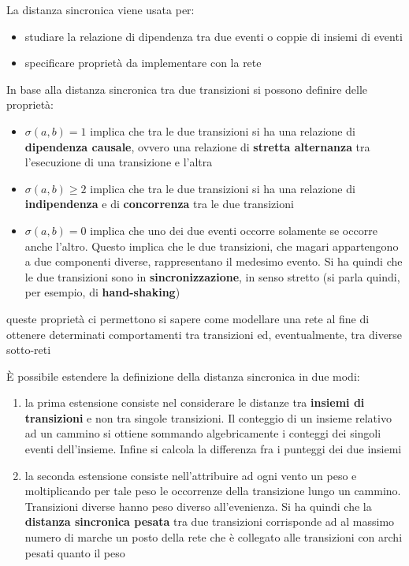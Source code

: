 \documentclass[a4paper,12pt, oneside]{book}
\begin{document}
La distanza sincronica viene usata per:
\begin{itemize}
  \item studiare la relazione di dipendenza tra due eventi o coppie di insiemi
  di eventi
  \item specificare proprietà da implementare con la rete
\end{itemize}
\newpage
\begin{definizione}
  In base alla distanza sincronica tra due transizioni si possono definire delle
  proprietà:
  \begin{itemize}
    \item $\sigma(a,b)=1$ implica che tra le due transizioni si ha una relazione
    di \textbf{dipendenza causale}, ovvero una relazione di \textbf{stretta
      alternanza} tra l'esecuzione di una transizione e l'altra
    \item $\sigma(a,b)\geq 2$ implica che tra le due transizioni si ha una
    relazione di \textbf{indipendenza} e di \textbf{concorrenza} tra
    le due transizioni
    \item $\sigma(a,b)=0$ implica che uno dei due eventi occorre solamente se
    occorre anche l'altro. Questo implica che le due transizioni, che magari
    appartengono a due componenti diverse, rappresentano il medesimo evento. Si
    ha quindi che le due transizioni sono in \textbf{sincronizzazione}, in senso
    stretto (si parla quindi, per esempio, di \textbf{hand-shaking})
  \end{itemize}
  queste proprietà ci permettono si sapere come modellare una rete al fine
  di ottenere determinati comportamenti tra transizioni ed, eventualmente, tra
  diverse sotto-reti
\end{definizione}
È possibile estendere la definizione della distanza sincronica in due modi:
\begin{enumerate}
  \item la prima estensione consiste nel considerare le distanze tra
  \textbf{insiemi di transizioni} e non tra singole transizioni. Il conteggio di
  un insieme relativo ad un cammino si ottiene sommando algebricamente i
  conteggi dei singoli eventi dell'insieme. Infine si calcola la differenza fra
  i punteggi dei due insiemi
  \item la seconda estensione consiste nell'attribuire ad ogni vento un peso e
  moltiplicando per tale peso le occorrenze della transizione lungo un
  cammino. Transizioni diverse hanno peso diverso all'evenienza. Si ha quindi
  che la \textbf{distanza sincronica pesata} tra due transizioni corrisponde ad
  al massimo numero di marche un posto della rete che è collegato alle
  transizioni con archi pesati quanto il peso
\end{enumerate}
\end{document}

